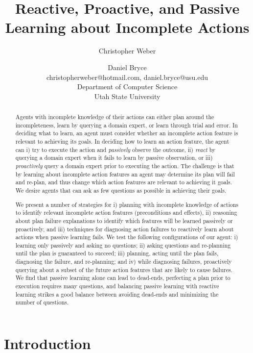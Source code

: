 \documentclass[letterpaper]{article}
\title{Reactive, Proactive, and Passive Learning about Incomplete Actions}
\author{Christopher Weber \and Daniel Bryce\\
christopherweber@hotmail.com, daniel.bryce@usu.edu\\
Department of Computer Science\\
Utah State University}
\begin{document}
\maketitle

\begin{abstract}
Agents with incomplete knowledge of their actions can either plan around the
incompleteness, learn by querying a domain expert, or learn through
trial and error.  In deciding what to learn, an agent must consider whether an
incomplete action feature is relevant to achieving its goals.  In deciding how
to learn an action feature, the agent can i) try to execute the action and
{\em passively} observe the outcome, ii) {\em react} by querying a domain expert
when it fails to learn by passive observation, or iii) {\em proactively} query a
domain expert prior to executing the action.  The challenge is that by learning about
incomplete action features an agent may determine its plan will fail and
re-plan, and thus change which action features are relevant to achieving it
goals.  We desire agents that can ask as few questions as
possible in achieving their goals.

We present a number of strategies for i) planning with incomplete knowledge of
actions to identify relevant incomplete action features (preconditions and
effects), ii) reasoning about plan failure explanations to identify which
features will be learned passively or proactively, and iii) techniques for
diagnosing action failures to reactively learn about actions when passive
learning fails.  We test the following configurations of our agent: i) learning
only passively and asking no questions; ii) asking questions and re-planning
until the plan is guaranteed to succeed; iii) planning, acting until the plan
fails, diagnosing the failure, and re-planning; and iv) while diagnosing
failures, proactively querying about a subset of the future action features that are likely to cause failures. 
We find that passive learning alone can lead to dead-ends, perfecting a plan
prior to execution requires many questions, and balancing passive learning with
reactive learning strikes a good balance between avoiding dead-ends and
minimizing the number of questions.



\end{abstract}

\section{Introduction}
\end{document}
